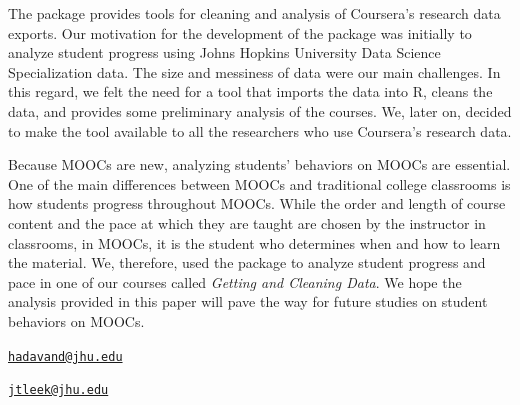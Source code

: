 The  package provides tools for cleaning and analysis of
Coursera's research data exports. Our motivation for the development of
the package was initially to analyze student progress using Johns
Hopkins University Data Science Specialization data. The size and
messiness of data were our main challenges. In this regard, we felt the
need for a tool that imports the data into R, cleans the data, and
provides some preliminary analysis of the courses. We, later on, decided
to make the tool available to all the researchers who use Coursera's
research data.

Because MOOCs are new, analyzing students' behaviors on MOOCs are
essential. One of the main differences between MOOCs and traditional
college classrooms is how students progress throughout MOOCs. While the
order and length of course content and the pace at which they are taught
are chosen by the instructor in classrooms, in MOOCs, it is the student
who determines when and how to learn the material. We, therefore, used
the  package to analyze student progress and pace in one of
our courses called \emph{Getting and Cleaning Data}. We hope the
analysis provided in this paper will pave the way for future studies on
student behaviors on MOOCs.



\address{%
Aboozar Hadavand\\
Bloomberg School of Public Health, Johns Hopkins University\\
615 N. Wolfe Street\\ Baltimore, MD 21205, USA\\
}
\href{mailto:hadavand@jhu.edu}{\nolinkurl{hadavand@jhu.edu}}

\address{%
Jeffrey Leek\\
Bloomberg School of Public Health, Johns Hopkins University\\
615 N. Wolfe Street\\ Baltimore, MD 21205, USA\\
}
\href{mailto:jtleek@jhu.edu}{\nolinkurl{jtleek@jhu.edu}}

